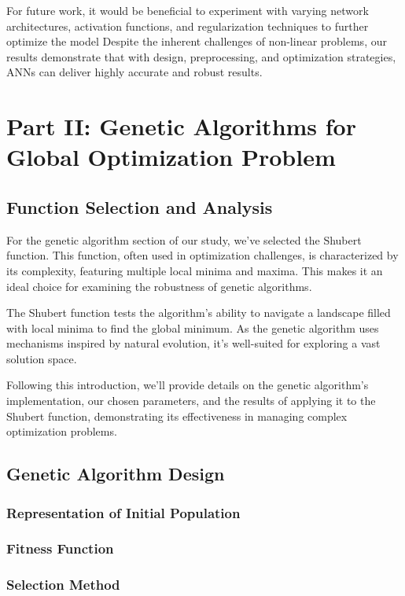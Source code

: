 \documentclass[conference]{inc/IEEEtran}
\begin{document}
For future work, it would be beneficial to experiment with varying network architectures, activation functions, and regularization techniques to further optimize the model Despite the inherent challenges of non-linear problems, our results demonstrate that with design, preprocessing, and optimization strategies, ANNs can deliver highly accurate and robust results.


\section{Part II: Genetic Algorithms for Global Optimization Problem}

\subsection{Function Selection and Analysis}

For the genetic algorithm section of our study, we've selected the Shubert function. This function, often used in optimization challenges, is characterized
by its complexity, featuring multiple local minima and maxima. This makes it an ideal choice for examining the robustness of genetic algorithms.

The Shubert function tests the algorithm's ability to navigate a landscape filled with local minima to find the global minimum. As the genetic algorithm
uses mechanisms inspired by natural evolution, it's well-suited for exploring a vast solution space.

Following this introduction, we'll provide details on the genetic algorithm's implementation, our chosen parameters, and the results of applying it to the
Shubert function, demonstrating its effectiveness in managing complex optimization problems.

\subsection{Genetic Algorithm Design}

\subsubsection{Representation of Initial Population}

\subsubsection{Fitness Function}

\subsubsection{Selection Method}
\end{document}
